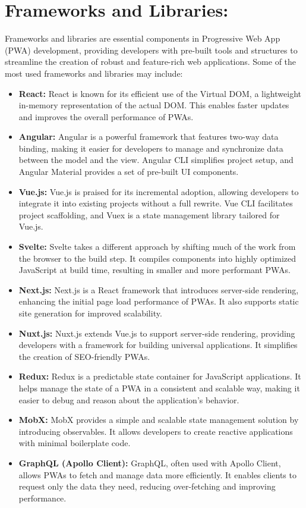 \documentclass[conference]{IEEEtran}
\begin{document}
\section{Frameworks and Libraries:}
Frameworks and libraries are essential components in Progressive Web App (PWA) development, providing developers with pre-built tools and structures to streamline the creation of robust and feature-rich web applications. Some of the most used frameworks and libraries may include:
\begin{itemize}
  \item \textbf{React:} React is known for its efficient use of the Virtual DOM, a lightweight in-memory representation of the actual DOM. This enables faster updates and improves the overall performance of PWAs.
  \item \textbf{Angular:} Angular is a powerful framework that features two-way data binding, making it easier for developers to manage and synchronize data between the model and the view. Angular CLI simplifies project setup, and Angular Material provides a set of pre-built UI components.
  \item \textbf{Vue.js:} Vue.js is praised for its incremental adoption, allowing developers to integrate it into existing projects without a full rewrite. Vue CLI facilitates project scaffolding, and Vuex is a state management library tailored for Vue.js.
  \item \textbf{Svelte:} Svelte takes a different approach by shifting much of the work from the browser to the build step. It compiles components into highly optimized JavaScript at build time, resulting in smaller and more performant PWAs.
  \item \textbf{Next.js:} Next.js is a React framework that introduces server-side rendering, enhancing the initial page load performance of PWAs. It also supports static site generation for improved scalability.
  \item \textbf{Nuxt.js:} Nuxt.js extends Vue.js to support server-side rendering, providing developers with a framework for building universal applications. It simplifies the creation of SEO-friendly PWAs.
  \item \textbf{Redux:} Redux is a predictable state container for JavaScript applications. It helps manage the state of a PWA in a consistent and scalable way, making it easier to debug and reason about the application's behavior.
  \item \textbf{MobX:} MobX provides a simple and scalable state management solution by introducing observables. It allows developers to create reactive applications with minimal boilerplate code.
  \item \textbf{GraphQL (Apollo Client):} GraphQL, often used with Apollo Client, allows PWAs to fetch and manage data more efficiently. It enables clients to request only the data they need, reducing over-fetching and improving performance.
\end{itemize}
\end{document}

